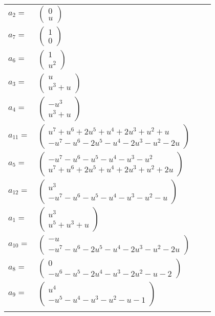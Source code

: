 \documentclass[1p]{elsarticle_modified}
\theoremstyle{definition}
\begin{document}
\begin{tabular}{m{7pt} m{180pt} m{7pt} m{180pt} }
\flushright $a_{2}=$&$\begin{pmatrix}0\\u\end{pmatrix}$ \\
\flushright $a_{7}=$&$\begin{pmatrix}1\\0\end{pmatrix}$ \\
\flushright $a_{6}=$&$\begin{pmatrix}1\\u^2\end{pmatrix}$ \\
\flushright $a_{3}=$&$\begin{pmatrix}u\\u^3+u\end{pmatrix}$ \\
\flushright $a_{4}=$&$\begin{pmatrix}- u^3\\u^3+u\end{pmatrix}$ \\
\flushright $a_{11}=$&$\begin{pmatrix}u^7+u^6+2 u^5+u^4+2 u^3+u^2+u\\- u^7- u^6-2 u^5- u^4-2 u^3- u^2-2 u\end{pmatrix}$ \\
\flushright $a_{5}=$&$\begin{pmatrix}- u^7- u^6- u^5- u^4- u^3- u^2\\u^7+u^6+2 u^5+u^4+2 u^3+u^2+2 u\end{pmatrix}$ \\
\flushright $a_{12}=$&$\begin{pmatrix}u^3\\- u^7- u^6- u^5- u^4- u^3- u^2- u\end{pmatrix}$ \\
\flushright $a_{1}=$&$\begin{pmatrix}u^3\\u^5+u^3+u\end{pmatrix}$ \\
\flushright $a_{10}=$&$\begin{pmatrix}- u\\- u^7- u^6-2 u^5- u^4-2 u^3- u^2-2 u\end{pmatrix}$ \\
\flushright $a_{8}=$&$\begin{pmatrix}0\\- u^6- u^5-2 u^4- u^3-2 u^2- u-2\end{pmatrix}$ \\
\flushright $a_{9}=$&$\begin{pmatrix}u^4\\- u^5- u^4- u^3- u^2- u-1\end{pmatrix}$\\&\end{tabular}
\end{document}
